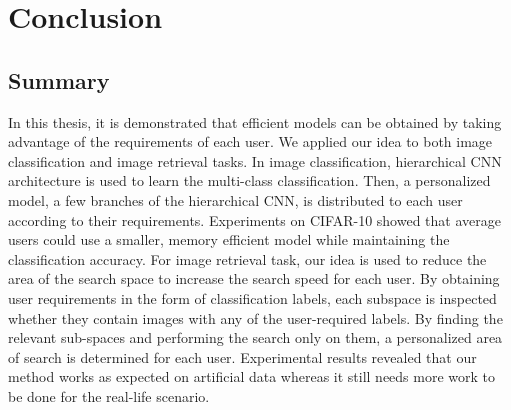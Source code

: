 
\lhead[\chaptername~\thechapter]{\rightmark}

\rhead[\leftmark]{}

\lfoot[\thepage]{}

\cfoot{}

\rfoot[]{\thepage}

\chapter{Conclusion}
\label{conclusion}


\section{Summary}

In this thesis, it is demonstrated that efficient models can be obtained by taking advantage of the requirements of each user. 
We applied our idea to both image classification and image retrieval tasks.
In image classification, hierarchical CNN architecture is used to learn the multi-class classification. 
Then, a personalized model, a few branches of the hierarchical CNN, is distributed to each user according to their requirements.
Experiments on CIFAR-10 showed that average users could use a smaller, memory efficient model while maintaining the classification accuracy.
For image retrieval task, our idea is used to reduce the area of the search space to increase the search speed for each user.
By obtaining user requirements in the form of classification labels, each subspace is inspected whether they contain images with any of the user-required labels. 
By finding the relevant sub-spaces and performing the search only on them, a personalized area of search is determined for each user. 
Experimental results revealed that our method works as expected on artificial data whereas it still needs more work to be done for the real-life scenario.


